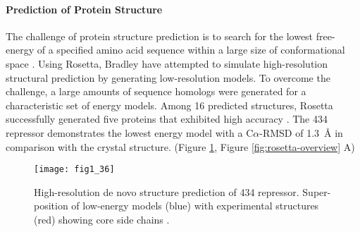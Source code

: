 \begin{refsection}
\paragraph{Prediction of Protein Structure}
The challenge of  protein structure prediction is to search for the
lowest free-energy of a specified amino acid sequence within a large size of
conformational space \cite{Bradley2005}. Using Rosetta, Bradley 
have attempted to simulate high-resolution structural prediction
by generating low-resolution models. To overcome the challenge, a large amounts
of sequence homologs were generated for a characteristic set of energy
models. Among 16 predicted structures, Rosetta successfully generated five
proteins that exhibited high accuracy \cite{Bradley2005}. The 434 repressor
demonstrates the lowest energy model with a C$\alpha$-RMSD of
\SI{1.3}{\angstrom} in comparison with the crystal structure. (Figure
\ref{fig:434}, Figure \ref{fig:rosetta-overview} A)
\begin{figure}[htbp] \centering \texttt{[image: fig1\_36]}
    \caption[High-resolution de novo structure prediction of 434 repressor.
    Super-position of low-energy models (blue) with experimental structures
(red) showing core side chains.]{High-resolution de novo structure prediction
    of 434 repressor. Super-position of low-energy models (blue) with
    experimental structures (red) showing core side chains \cite{Bradley2005}.}
    \label{fig:434}
\end{figure}


\end{refsection}
